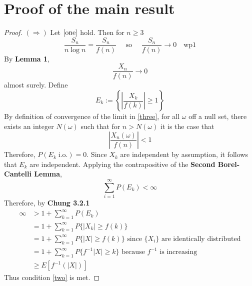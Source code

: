 \documentclass[letterpaper, 12pt]{article}
\newcommand{\io}{\;\text{i.o.}}
\newcommand{\sioi}{\sum_{i=1}^\infty}
\newcommand{\skoi}{\sum_{k=1}^\infty}
\begin{document}
\section*{Proof of the main result}
\begin{proof}
$(\Rightarrow)$ Let $\eqref{one}$ hold. Then for $n \geq 3$
\[
\frac{S_n}{n \log n} = \frac{S_n}{f(n)} \quad\text{ so }\quad \frac{S_n}{f(n)} \to 0 \quad\text{wp}1
\]
By \textbf{Lemma 1},
\begin{equation}
\frac{X_n}{f(n)} \to 0
\label{three}
\end{equation}
almost surely. Define 
\[
E_k := 
\left\{
\left\lvert
\frac{X_k}{f(k)}
\right\rvert
\geq 1
\right\}
\]
By definition of convergence of the limit in \eqref{three}, for all $\omega$ off a null set, there exists an integer $N(\omega)$ such that for $n > N(\omega)$ it is the case that
\[
\left\lvert
\frac{X_n(\omega)}{f(n)}
\right\rvert
<1
\]
Therefore, $P(E_k \io) = 0$. Since $X_k$ are independent by assumption, it follows that $E_k$ are independent. Applying the contrapositive of the \textbf{Second Borel-Cantelli Lemma}, 
\[
\sioi P(E_k) < \infty
\]
Therefore, by \textbf{Chung 3.2.1}
\begin{align*}
\infty 
&>
1 + \skoi P(E_k)
\\
&=
1 + \skoi P\{|X_k| \geq f(k)\}
\\
&=
1 + \skoi P\{|X| \geq f(k)\} 
\text{ since $\{X_i\}$ are identically distributed}
\\
&=
1 + \skoi P\{f^{-1}|X| \geq k\} 
\text{ because $f^{-1}$ is increasing}
\\
&\geq
E[f^{-1}(|X|)]
\end{align*}
Thus condition \eqref{two} is met.


\end{proof}
\end{document}
